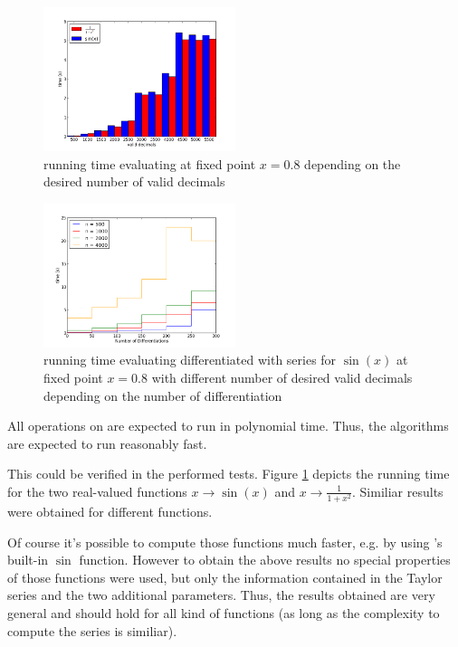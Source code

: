 			\begin{figure}[h]
				\centering
				\includegraphics[width=0.5\textwidth]{img/analytic/ba_ana_dep_on_n_bar.png}
				\caption{running time evaluating \baana at fixed point $x=0.8$ depending on the desired number of valid decimals}
				\label{fig:ba_ana dep on n}
			\end{figure}
			\begin{figure}[h]
				\centering
				\includegraphics[width=0.5\textwidth]{img/analytic/ba_ana_dep_on_diff_sin.png}
				\caption{running time evaluating differentiated \baana with series for $\sin(x)$ at fixed point $x=0.8$ with different number
        of desired valid decimals depending on the number of differentiation}
				\label{fig:ba_ana dep on differentiation}
			\end{figure}
      All operations on \baana are expected to run in polynomial time.
      Thus, the algorithms are expected to run reasonably fast.

      This could be verified in the performed tests. 
      Figure \ref{fig:ba_ana dep on n} depicts the running time for the two real-valued functions $x \to \sin(x)$ and $x \to \frac{1}{1+x^2}$.
      Similiar results were obtained for different functions.

      Of course it's possible to compute those functions much faster, e.g. by using {\irram}'s built-in $\sin$ function.
      However to obtain the above results no special properties of those functions were used, but only the information 
      contained in the Taylor series and the two additional parameters.
      Thus, the results obtained are very general and should hold for all kind of functions (as long as the complexity to compute
      the series is similiar).

